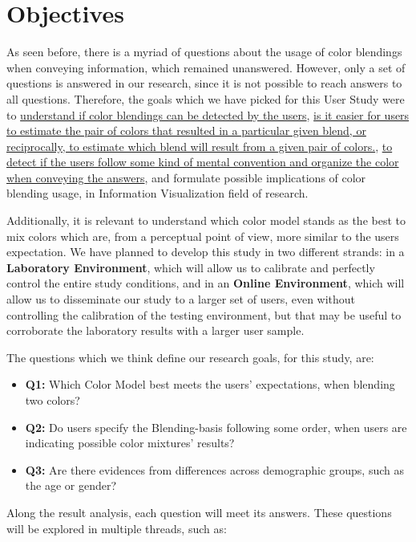 \section{Objectives}
\label{sec:impl_objectives}
%
As seen before, there is a myriad of questions about the usage of color blendings when conveying information,
which remained unanswered. However, only a set of questions is answered in our research, since it is not possible
to reach answers to all questions. Therefore, the goals which we have picked for this User Study were to
\ul{understand if color blendings can be detected by the users}, \ul{is it easier for users to estimate the pair
of colors that resulted in a particular given blend, or reciprocally, to estimate which blend will result from a
given pair of colors.}, \ul{to detect if the users follow some kind of mental convention and organize the color
when conveying the answers}, and formulate possible implications of color blending usage, in Information Visualization field of research. \par
%
Additionally, it is relevant to understand which color model stands as the best to mix colors which are, from a
perceptual point of view, more similar to the users expectation. We have planned to develop this study in two
different strands: in a \textbf{Laboratory Environment}, which will allow us to calibrate and perfectly control the
entire study conditions, and in an \textbf{Online Environment}, which will allow us to disseminate our study to a
larger set of users, even without controlling the calibration of the testing environment, but that may be useful
to corroborate the laboratory results with a larger user sample. \par
%
The questions which we think define our research goals, for this study, are:
%
\begin{itemize}
	\item \textbf{Q1:} Which Color Model best meets the users' expectations, when blending two colors?
	\item \textbf{Q2:} Do users specify the Blending-basis following some order, when users are indicating possible color
	mixtures' results?
	\item \textbf{Q3:} Are there evidences from differences across demographic groups, such as the age or gender?
\end{itemize}
%
Along the result analysis, each question will meet its answers. These questions will be explored in multiple
threads, such as:
%
